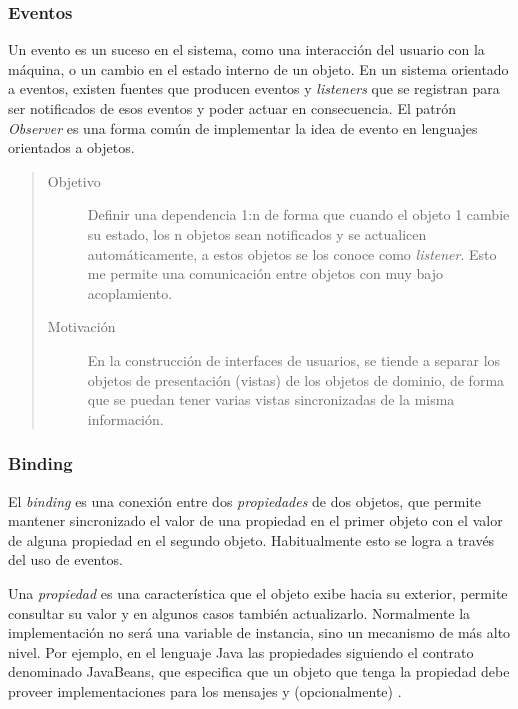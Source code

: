 \subsubsection{Eventos}
\label{Eventos}

		Un evento es un suceso en el sistema, como una interacción del usuario con
	la máquina, o un cambio en el estado interno de un objeto.
	En un sistema orientado a eventos, existen fuentes que producen eventos y
	\emph{listeners} que se registran para ser notificados de esos eventos y poder
	actuar en consecuencia.	
	El patrón \emph{Observer} \cite{Gamma1995} es una forma común de implementar la
	idea de evento en lenguajes orientados a objetos.
	
	\begin{quote}
	
	\begin{description}
	   
	\item [Objetivo] Definir una dependencia 1:n de forma que cuando el objeto
		1 cambie su estado, los n objetos sean notificados y se actualicen
		automáticamente, a estos objetos se los conoce como \emph{listener}. Esto me
		permite una comunicación entre objetos con muy bajo acoplamiento.
	
	\item [Motivación] En la construcción de interfaces de usuarios, se tiende
		a separar los objetos de presentación (vistas) de los objetos de dominio, de
		forma que se puedan tener varias vistas sincronizadas de la misma información.
	
	\end{description}
	\end{quote}
	
\subsubsection{Binding}
\label{binding}

	El \emph{binding} es una conexión entre dos \emph{propiedades} de dos objetos, que
	permite mantener sincronizado el valor de una propiedad en el primer
	objeto con el valor de alguna propiedad en el segundo objeto.
	Habitualmente esto se logra a través del uso de eventos.
	
	Una \emph{propiedad} es una característica que el objeto exibe hacia su exterior, 
	permite consultar su valor y en algunos casos también actualizarlo.
	Normalmente la implementación no será una variable de instancia, sino un mecanismo de más alto nivel.
	Por ejemplo, en el lenguaje Java las propiedades siguiendo el contrato denominado JavaBeans, 
	que especifica que un objeto que tenga la propiedad  
	debe proveer implementaciones para los mensajes  y (opcionalmente) .
	
